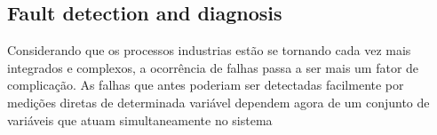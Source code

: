 \documentclass[10pt,fleqn,a4paper]{article}
\begin{document}

\subsection{Fault detection and diagnosis}
Considerando que os processos industrias estão se tornando cada vez mais
integrados e complexos, a ocorrência de falhas passa a ser mais um fator de
complicação. As falhas que antes poderiam ser detectadas facilmente por medições
diretas de determinada variável dependem agora de um conjunto de variáveis que
atuam simultaneamente no sistema
\end{document}
